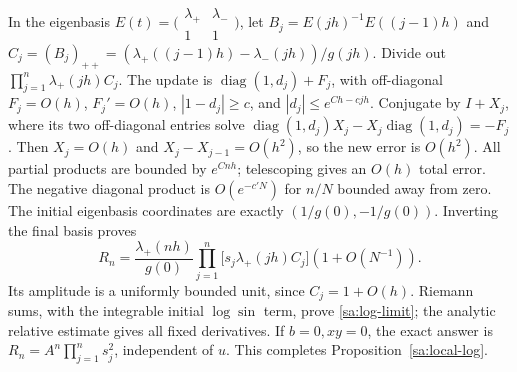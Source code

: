 In the eigenbasis $E(t)=\bigl(\begin{smallmatrix}\lambda_+&\lambda_-\\1&1\end{smallmatrix}\bigr)$,
let $B_j=E(jh)^{-1}E((j-1)h)$ and
$C_j=(B_j)_{++}=(\lambda_+((j-1)h)-\lambda_-(jh))/g(jh)$.
Divide out $\prod_{j=1}^n\lambda_+(jh)C_j$. The update is
$\operatorname{diag}(1,d_j)+F_j$, with off-diagonal $F_j=O(h)$,
$F_j'=O(h)$, $|1-d_j|\ge c$, and
$|d_j|\le e^{Ch-cjh}$.
Conjugate by $I+X_j$, where its two off-diagonal entries solve
$\operatorname{diag}(1,d_j)X_j-X_j\operatorname{diag}(1,d_j)=-F_j$.
Then $X_j=O(h)$ and $X_j-X_{j-1}=O(h^2)$, so the new error is
$O(h^2)$. All partial products are bounded by $e^{Cnh}$; telescoping
gives an $O(h)$ total error. The negative diagonal product is
$O(e^{-c'N})$ for $n/N$ bounded away from zero.
The initial eigenbasis coordinates are exactly $(1/g(0),-1/g(0))$.
Inverting the final basis proves
\begin{equation}\label{sa:protected-packet}
 R_n=\frac{\lambda_+(nh)}{g(0)}
      \prod_{j=1}^n\bigl[s_j\lambda_+(jh)C_j\bigr](1+O(N^{-1})).
\end{equation}
Its amplitude is a uniformly bounded unit, since $C_j=1+O(h)$.
Riemann sums, with the integrable initial $\log\sin$ term, prove
\eqref{sa:log-limit}; the analytic relative estimate gives all fixed
derivatives. If $b=0,xy=0$, the exact answer is
$R_n=A^n\prod_{j=1}^ns_j^2$, independent of $u$.
This completes Proposition~\ref{sa:local-log}.

